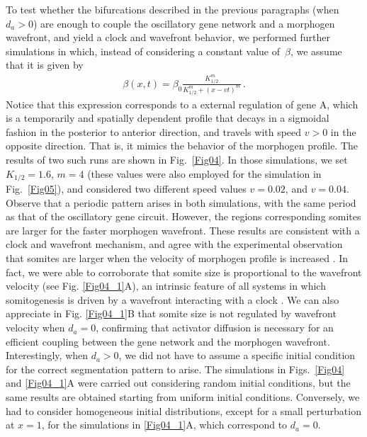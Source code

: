 \documentclass[%
 preprint,
 aip, 
 amsmath,amssymb,
]{revtex4-2}
\begin{document}
To test whether the bifurcations described in the previous paragraphs (when $d_a > 0$) are enough to couple the oscillatory gene network and a morphogen wavefront, and yield a clock and wavefront behavior, we performed further simulations in which, instead of considering a constant value of~$\beta$, we assume that it is given by
	\begin{gather}\label{eqbeta}
	\beta(x, t) = \beta_0 \frac{K_{1/2}^m}{K_{1/2}^m + (x - v t)^m}\,.
	\end{gather}
Notice that this expression corresponds to a external regulation of gene A, which is a temporarily and spatially dependent profile that decays in a sigmoidal fashion in the posterior to anterior direction, and travels with speed $v>0$ in the opposite direction. That is, it mimics the behavior of the morphogen profile. The results of two such runs are shown in Fig.~\ref{Fig04}. In those simulations, we set $K_{1/2} =1.6 $, $m = 4 $ (these values were also employed for the simulation in Fig.~\ref{Fig05}), and considered two different speed values $v = 0.02 $, and $v = 0.04$. Observe that a periodic pattern arises in both simulations, with the same period as that of the oscillatory gene circuit. However, the regions corresponding somites are larger for the faster morphogen wavefront. These results are consistent with a clock and wavefront mechanism, and agree with the experimental observation that somites are larger when the velocity of morphogen profile is increased \cite{Sawada2001}. In fact, we were able to corroborate that somite size is proportional to the wavefront velocity (see Fig. \ref{Fig04_1}A), an intrinsic feature of all systems in which somitogenesis is driven by a wavefront interacting with a clock \cite{Morelli2009}. We can also appreciate  in Fig. \ref{Fig04_1}B that somite size is not regulated by wavefront velocity when $d_a=0$, confirming that activator diffusion is necessary for an efficient coupling between the gene network and the morphogen wavefront. Interestingly, when $d_a > 0$, we did not have to  assume a specific initial condition for the correct segmentation pattern to arise. The simulations in Figs.~\ref{Fig04} and \ref{Fig04_1}A were carried out considering random initial conditions, but the same results are obtained starting from uniform initial conditions. Conversely, we had to consider homogeneous initial distributions, except for a small perturbation at $x=1$, for the simulations in \ref{Fig04_1}A, which correspond to $d_a=0$.
\end{document}
